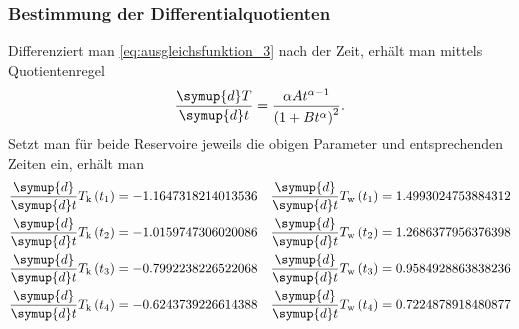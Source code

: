 

\subsubsection[]{Bestimmung der Differentialquotienten}
Differenziert man \eqref{eq:ausgleichsfunktion_3} nach der Zeit, erhält man mittels Quotientenregel
\begin{align*}
    \frac{\symup{d}T}{\symup{d}t} = \frac{\alpha A t^{\alpha -1}}{\left(1 + B t^{\alpha}\right)^2}.
\end{align*}
%
Setzt man für beide Reservoire jeweils die obigen Parameter und entsprechenden Zeiten ein, erhält man 
\begin{align*}
    \frac{\symup{d}}{\symup{d}t} T_\text{k} \left(t_1\right) &= -1.1647318214013536 &
    \frac{\symup{d}}{\symup{d}t} T_\text{w} \left(t_1\right) &= 1.4993024753884312  \\
    \frac{\symup{d}}{\symup{d}t} T_\text{k} \left(t_2\right) &= -1.0159747306020086 &
    \frac{\symup{d}}{\symup{d}t} T_\text{w} \left(t_2\right) &= 1.2686377956376398 \\
    \frac{\symup{d}}{\symup{d}t} T_\text{k} \left(t_3\right) &= -0.7992238226522068 &
    \frac{\symup{d}}{\symup{d}t} T_\text{w} \left(t_3\right) &= 0.9584928863838236 \\
    \frac{\symup{d}}{\symup{d}t} T_\text{k} \left(t_4\right) &= -0.6243739226614388 &
    \frac{\symup{d}}{\symup{d}t} T_\text{w} \left(t_4\right) &= 0.7224878918480877 
\end{align*}
%

